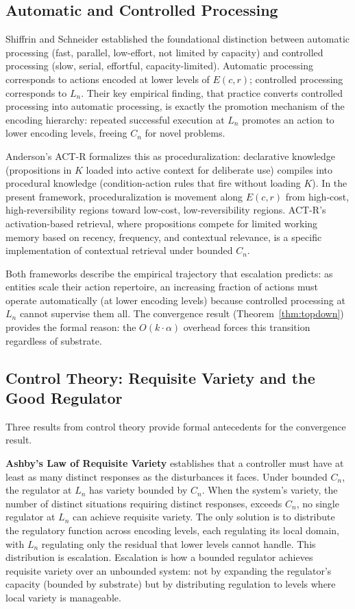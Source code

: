 \documentclass[11pt]{article}
\theoremstyle{definition}
\begin{document}
\subsection{Automatic and Controlled Processing}

Shiffrin and Schneider \cite{ShiffrinSchneider1977} established the
foundational distinction between automatic processing (fast, parallel,
low-effort, not limited by capacity) and controlled processing (slow,
serial, effortful, capacity-limited). Automatic processing corresponds
to actions encoded at lower levels of $E(c,r)$; controlled processing
corresponds to $L_n$. Their key empirical finding, that practice
converts controlled processing into automatic processing, is exactly
the promotion mechanism of the encoding hierarchy: repeated successful
execution at $L_n$ promotes an action to lower encoding levels, freeing
$C_n$ for novel problems.

Anderson's ACT-R \cite{Anderson1993} formalizes this as
proceduralization: declarative knowledge (propositions in $K$ loaded
into active context for deliberate use) compiles into procedural
knowledge (condition-action rules that fire without loading $K$). In
the present framework, proceduralization is movement along $E(c,r)$
from high-cost, high-reversibility regions toward low-cost,
low-reversibility regions. ACT-R's activation-based retrieval, where
propositions compete for limited working memory based on
recency, frequency, and contextual relevance, is a specific
implementation of contextual retrieval under bounded $C_n$.

Both frameworks describe the empirical trajectory that escalation
predicts: as entities scale their action repertoire, an increasing
fraction of actions must operate automatically (at lower encoding
levels) because controlled processing at $L_n$ cannot supervise
them all. The convergence result (Theorem~\ref{thm:topdown}) provides
the formal reason: the $O(k \cdot \alpha)$ overhead forces this
transition regardless of substrate.

\subsection{Control Theory: Requisite Variety and the Good Regulator}

Three results from control theory provide formal antecedents for the
convergence result.

\textbf{Ashby's Law of Requisite Variety} \cite{Ashby1956} establishes
that a controller must have at least as many distinct responses as the
disturbances it faces. Under bounded $C_n$, the regulator at $L_n$ has
variety bounded by $C_n$. When the system's variety, the number of
distinct situations requiring distinct responses, exceeds $C_n$, no
single regulator at $L_n$ can achieve requisite variety. The only
solution is to distribute the regulatory function across encoding
levels, each regulating its local domain, with $L_n$ regulating only
the residual that lower levels cannot handle. This distribution is
escalation. Escalation is how a bounded regulator achieves requisite
variety over an unbounded system: not by expanding the regulator's
capacity (bounded by substrate) but by distributing regulation to
levels where local variety is manageable.
\end{document}
